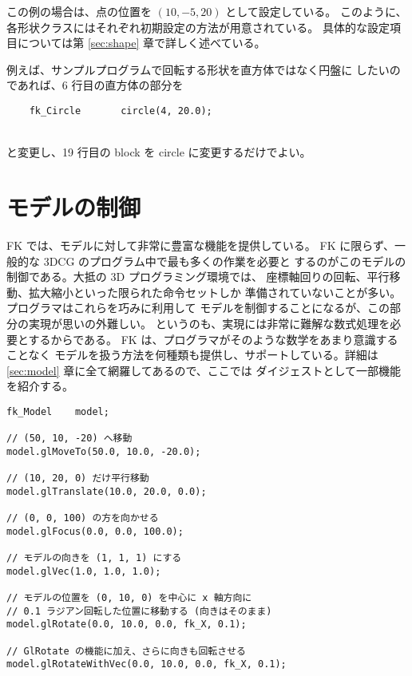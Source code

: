 この例の場合は、点の位置を \((10, -5, 20)\) として設定している。
このように、各形状クラスにはそれぞれ初期設定の方法が用意されている。
具体的な設定項目については第 \ref{sec:shape} 章で詳しく述べている。

例えば、サンプルプログラムで回転する形状を直方体ではなく円盤に
したいのであれば、6 行目の直方体の部分を
\\
\begin{screen}
\begin{verbatim}
    fk_Circle       circle(4, 20.0);
\end{verbatim}
\end{screen}
~ \\
と変更し、19 行目の block を circle に変更するだけでよい。

\section{モデルの制御}
FK では、モデルに対して非常に豊富な機能を提供している。
FK に限らず、一般的な 3DCG のプログラム中で最も多くの作業を必要と
するのがこのモデルの制御である。大抵の 3D プログラミング環境では、
座標軸回りの回転、平行移動、拡大縮小といった限られた命令セットしか
準備されていないことが多い。プログラマはこれらを巧みに利用して
モデルを制御することになるが、この部分の実現が思いの外難しい。
というのも、実現には非常に難解な数式処理を必要とするからである。
FK は、プログラマがそのような数学をあまり意識することなく
モデルを扱う方法を何種類も提供し、サポートしている。詳細は
\ref{sec:model} 章に全て網羅してあるので、ここでは
ダイジェストとして一部機能を紹介する。
\\
\begin{screen}
\begin{verbatim}
fk_Model	model;

// (50, 10, -20) へ移動
model.glMoveTo(50.0, 10.0, -20.0);

// (10, 20, 0) だけ平行移動
model.glTranslate(10.0, 20.0, 0.0);

// (0, 0, 100) の方を向かせる
model.glFocus(0.0, 0.0, 100.0);

// モデルの向きを (1, 1, 1) にする
model.glVec(1.0, 1.0, 1.0);

// モデルの位置を (0, 10, 0) を中心に x 軸方向に
// 0.1 ラジアン回転した位置に移動する (向きはそのまま)
model.glRotate(0.0, 10.0, 0.0, fk_X, 0.1);

// GlRotate の機能に加え、さらに向きも回転させる
model.glRotateWithVec(0.0, 10.0, 0.0, fk_X, 0.1);
\end{verbatim}
\end{screen}
\\

